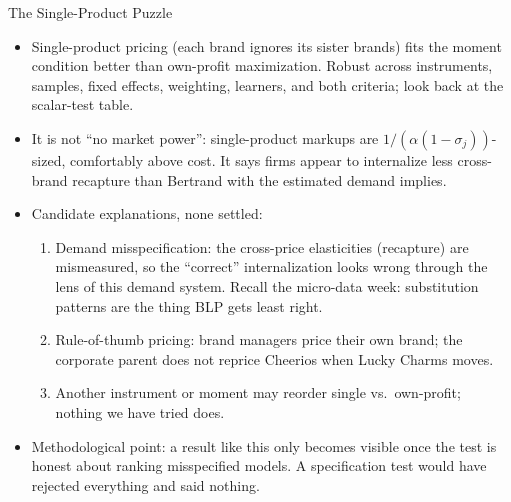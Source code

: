 \documentclass[aspectratio=169,10pt]{beamer}
\begin{document}
\begin{frame}{The Single-Product Puzzle}
\begin{itemize}
\item Single-product pricing (each brand ignores its sister brands) fits the moment condition \alert{better} than own-profit maximization. Robust across instruments, samples, fixed effects, weighting, learners, and both criteria; look back at the scalar-test table.
\item It is \alert{not} ``no market power'': single-product markups are $1/(\alpha(1-\sigma_j))$-sized, comfortably above cost. It says firms appear to internalize \alert{less} cross-brand recapture than Bertrand with the estimated demand implies.
\item Candidate explanations, none settled:
\begin{enumerate}
\item Demand misspecification: the cross-price elasticities (recapture) are mismeasured, so the ``correct'' internalization looks wrong through the lens of this demand system. Recall the micro-data week: substitution patterns are the thing BLP gets least right.
\item Rule-of-thumb pricing: brand managers price their own brand; the corporate parent does not reprice Cheerios when Lucky Charms moves.
\item Another instrument or moment may reorder single vs.\ own-profit; nothing we have tried does.
\end{enumerate}
\item Methodological point: a result like this only becomes visible once the test is honest about ranking misspecified models. A specification test would have rejected everything and said nothing.
\end{itemize}
\end{frame}
\end{document}
